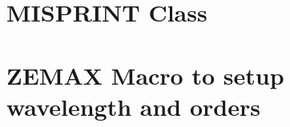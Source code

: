 \appendix
\vspace{-1.0cm}

\chapter{MISPRINT Class}\label{chap:MISPRINTcode}
%
			  
%
		
			  
\chapter{ZEMAX Macro to setup \echelle wavelength and orders}
